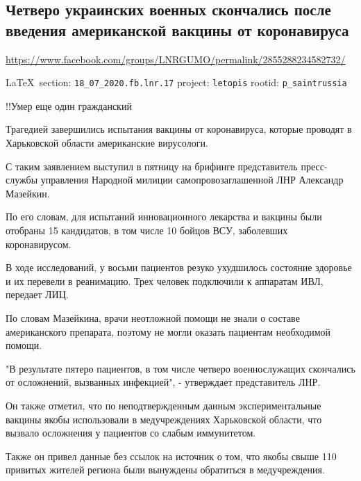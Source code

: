  
 

\subsection{Четверо украинских военных скончались после введения американской вакцины от коронавируса}
\label{sec:18_07_2020.fb.lnr.17}
\url{https://www.facebook.com/groups/LNRGUMO/permalink/2855288234582732/}
  
\vspace{0.5cm}
{\small\LaTeX~section: \verb|18_07_2020.fb.lnr.17| project: \verb|letopis| rootid: \verb|p_saintrussia|}
\vspace{0.5cm}

!!Умер еще один гражданский

Трагедией завершились испытания вакцины от коронавируса, которые проводят в
Харьковской области американские вирусологи.

С таким заявлением выступил в пятницу на брифинге представитель пресс-службы
управления Народной милиции самопровозаглашенной ЛНР Александр Мазейкин.

По его словам, для испытаний инновационного лекарства и вакцины были отобраны
15 кандидатов, в том числе 10 бойцов ВСУ, заболевших коронавирусом.

В ходе исследований, у восьми пациентов резуко ухудшилось состояние здоровье и
их перевели в реанимацию.  Трех человек подключили к аппаратам ИВЛ, передает
ЛИЦ.

По словам Мазейкина, врачи неотложной помощи не знали о составе американского
препарата, поэтому не могли оказать пациентам необходимой помощи.

"В результате пятеро пациентов, в том числе четверо военнослужащих скончались
от осложнений, вызванных инфекцией", - утверждает представитель ЛНР.

Он также отметил, что по неподтвержденным данным экспериментальные вакцины
якобы использовали в медучреждениях Харьковской области, что вызвало осложнения
у пациентов со слабым иммунитетом.

Также он привел данные без ссылок на источник о том, что якобы свыше 110
привитых жителей региона были вынуждены обратиться в медучреждения. 
